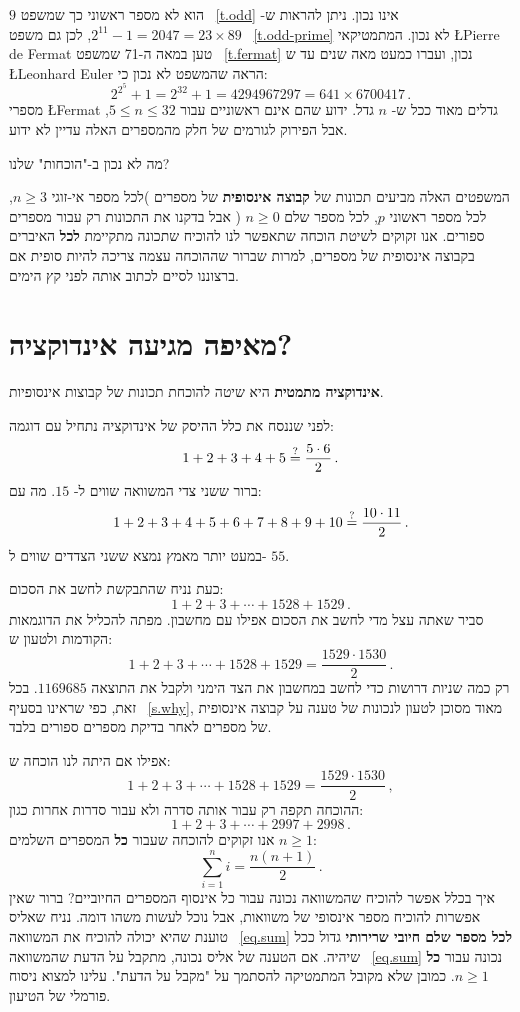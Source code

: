 
$9$
הוא לא מספר ראשוני כך שמשפט~%
\ref{t.odd}
אינו נכון. ניתן להראות ש-%
$2^{11}-1=2047=23\times 89$,
לכן גם משפט~
\ref{t.odd-prime}
לא נכון. המתמטיקאי
\L{Pierre de Fermat}
טען במאה ה-71 שמשפט~%
\ref{t.fermat}
נכון, ועברו כמעט מאה שנים עד ש
\L{Leonhard Euler}
הראה שהמשפט לא נכון כי:
\[
2^{2^5}+1 = 2^{32}+1 = 4294967297 = 641 \times 6700417\,.
\]
מספרי
\L{Fermat}
גדלים מאוד ככל ש-%
$n$
גדל. ידוע שהם אינם ראשוניים עבור
$5\leq n \leq 32$,
אבל הפירוק לגורמים של חלק מהמספרים האלה עדיין לא ידוע.

מה לא נכון ב-"הוכחות" שלנו?

המשפטים האלה מביעים תכונות של
\textbf{קבוצה אינסופית}
של מספרים )לכל מספר אי-זוגי
$n\geq 3$,
לכל מספר ראשוני
$p$,
לכל מספר שלם
$n\geq 0$%
(
אבל בדקנו את התכונות רק עבור מספרים ספורים. אנו זקוקים לשיטת הוכחה שתאפשר לנו להוכיח שתכונה מתקיימת
\textbf{לכל}
האיברים בקבוצה אינסופית של מספרים, למרות שברור שההוכחה עצמה צריכה להיות סופית אם ברצוננו לסיים לכתוב אותה לפני קץ הימים.


\section{%
מאיפה מגיעה אינדוקציה?%
}\label{s.where}

\textbf{אינדוקציה מתמטית}
היא שיטה להוכחת תכונות של קבוצות אינסופיות.

לפני שננסח את כלל ההיסק של אינדוקציה נתחיל עם דוגמה:
\[
1+2+3+4+5\stackrel{?}{=}{}\frac{5\cdot 6}{2}\,.
\]
ברור ששני צדי המשוואה שווים ל-%
$15$.
מה עם:
\[
1+2+3+4+5+6+7+8+9+10\stackrel{?}{=}{}\frac{10\cdot 11}{2}\,.
\]
במעט יותר מאמץ נמצא ששני הצדדים שווים ל-%
$55$.

כעת נניח שהתבקשת לחשב את הסכום:
\[
1+2+3+\cdots+1528+1529\,.
\]
סביר שאתה עצל מדי לחשב את הסכום אפילו עם מחשבון. מפתה להכליל את הדוגמאות הקודמות ולטעון ש:
\[
1+2+3+\cdots+1528+1529=\frac{1529\cdot 1530}{2}\,.
\]
רק כמה שניות דרושות כדי לחשב במחשבון את הצד הימני ולקבל את התוצאה
$1169685$.
בכל זאת, כפי שראינו בסעיף~%
\ref{s.why},
מאוד מסוכן לטעון לנכונות של טענה על קבוצה אינסופית של מספרים לאחר בדיקת מספרים ספורים בלבד.

אפילו אם היתה לנו הוכחה ש:
\[
1+2+3+\cdots+1528+1529=\frac{1529\cdot 1530}{2}\,,
\]
ההוכחה תקפה רק עבור אותה סדרה ולא עבור סדרות אחרות כגון:
\[
1+2+3+\cdots+2997+2998\,.
\]
אנו זקוקים להוכחה שעבור
\textbf{כל}
המספרים השלמים
$n\geq 1$:
\begin{equation}
\sum_{i=1}^n i = \frac{n(n+1)}{2}\,.\label{eq.sum}
\end{equation}
איך בכלל אפשר להוכיח שהמשוואה נכונה עבור כל אינסוף המספרים החיוביים? ברור שאין אפשרות להוכיח מספר אינסופי של משוואות, אבל נוכל לעשות משהו דומה. נניח שאליס טוענת שהיא יכולה להוכיח את המשוואה~%
\ref{eq.sum}
\textbf{לכל מספר שלם חיובי שרירותי}
גדול ככל שיהיה. אם הטענה של אליס נכונה, מתקבל על הדעת שהמשוואה~%
\ref{eq.sum}
נכונה עבור
\textbf{כל}
$n\geq 1$.
כמובן שלא מקובל המתמטיקה להסתמך על "מקבל על הדעת". עלינו למצוא ניסוח פורמלי של הטיעון.


